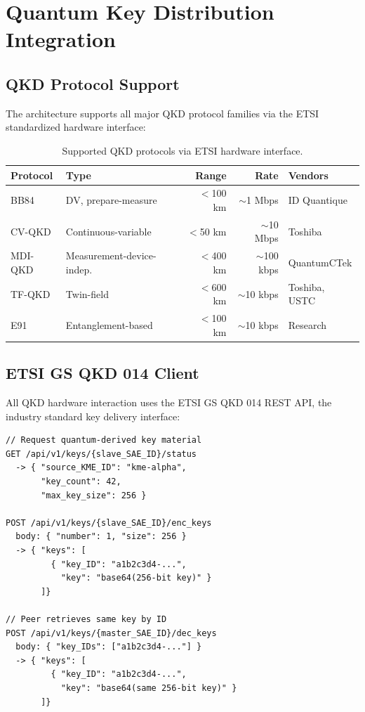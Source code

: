 \documentclass[11pt,letterpaper]{article}
\begin{document}
\section{Quantum Key Distribution Integration}

\subsection{QKD Protocol Support}

The architecture supports all major QKD protocol families via the ETSI standardized hardware interface:

\begin{table}[H]
\centering
\small
\begin{tabular}{@{}llrrl@{}}
\toprule
\textbf{Protocol} & \textbf{Type} & \textbf{Range} & \textbf{Rate} & \textbf{Vendors} \\
\midrule
BB84 & DV, prepare-measure & $<$100 km & $\sim$1 Mbps & ID Quantique \\
CV-QKD & Continuous-variable & $<$50 km & $\sim$10 Mbps & Toshiba \\
MDI-QKD & Measurement-device-indep. & $<$400 km & $\sim$100 kbps & QuantumCTek \\
TF-QKD & Twin-field & $<$600 km & $\sim$10 kbps & Toshiba, USTC \\
E91 & Entanglement-based & $<$100 km & $\sim$10 kbps & Research \\
\bottomrule
\end{tabular}
\caption{Supported QKD protocols via ETSI hardware interface.}
\label{tab:qkd-protocols}
\end{table}

\subsection{ETSI GS QKD 014 Client}

All QKD hardware interaction uses the ETSI GS QKD 014 REST API, the industry standard key delivery interface:

\begin{lstlisting}[caption={ETSI QKD 014 key request flow.}]
// Request quantum-derived key material
GET /api/v1/keys/{slave_SAE_ID}/status
  -> { "source_KME_ID": "kme-alpha",
       "key_count": 42,
       "max_key_size": 256 }

POST /api/v1/keys/{slave_SAE_ID}/enc_keys
  body: { "number": 1, "size": 256 }
  -> { "keys": [
         { "key_ID": "a1b2c3d4-...",
           "key": "base64(256-bit key)" }
       ]}

// Peer retrieves same key by ID
POST /api/v1/keys/{master_SAE_ID}/dec_keys
  body: { "key_IDs": ["a1b2c3d4-..."] }
  -> { "keys": [
         { "key_ID": "a1b2c3d4-...",
           "key": "base64(same 256-bit key)" }
       ]}
\end{lstlisting}
\end{document}
